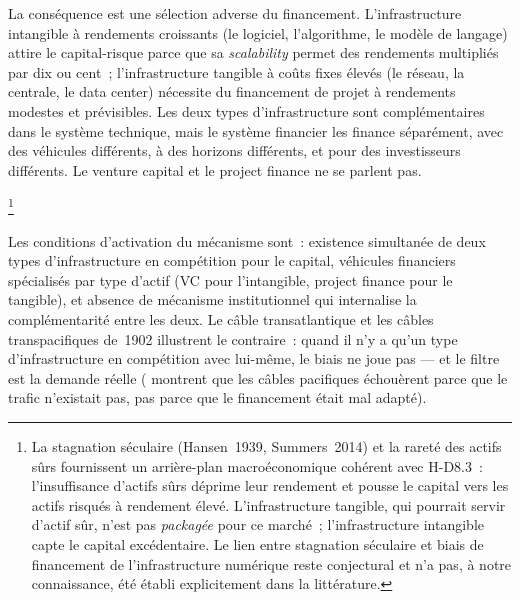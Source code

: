 La conséquence est une sélection adverse du financement. L'infrastructure intangible à rendements croissants (le logiciel, l'algorithme, le modèle de langage) attire le capital-risque parce que sa \emph{scalability} permet des rendements multipliés par dix ou cent~; l'infrastructure tangible à coûts fixes élevés (le réseau, la centrale, le data center) nécessite du financement de projet à rendements modestes et prévisibles. Les deux types d'infrastructure sont complémentaires dans le système technique, mais le système financier les finance séparément, avec des véhicules différents, à des horizons différents, et pour des investisseurs différents. Le venture capital et le project finance ne se parlent pas.

\footnote{La stagnation séculaire (Hansen~1939, Summers~2014) et la rareté des actifs sûrs \parencite{caballero_safe_2017} fournissent un arrière-plan macroéconomique cohérent avec H-D8.3~: l'insuffisance d'actifs sûrs déprime leur rendement et pousse le capital vers les actifs risqués à rendement élevé. L'infrastructure tangible, qui pourrait servir d'actif sûr, n'est pas \emph{packagée} pour ce marché~; l'infrastructure intangible capte le capital excédentaire. Le lien entre stagnation séculaire et biais de financement de l'infrastructure numérique reste conjectural et n'a pas, à notre connaissance, été établi explicitement dans la littérature.}

Les conditions d'activation du mécanisme sont~: existence simultanée de deux types d'infrastructure en compétition pour le capital, véhicules financiers spécialisés par type d'actif (VC pour l'intangible, project finance pour le tangible), et absence de mécanisme institutionnel qui internalise la complémentarité entre les deux. Le câble transatlantique et les câbles transpacifiques de~1902 illustrent le contraire~: quand il n'y a qu'un type d'infrastructure en compétition avec lui-même, le biais ne joue pas --- et le filtre est la demande réelle (\textcite{muller_telegraph_2015} montrent que les câbles pacifiques échouèrent parce que le trafic n'existait pas, pas parce que le financement était mal adapté).

